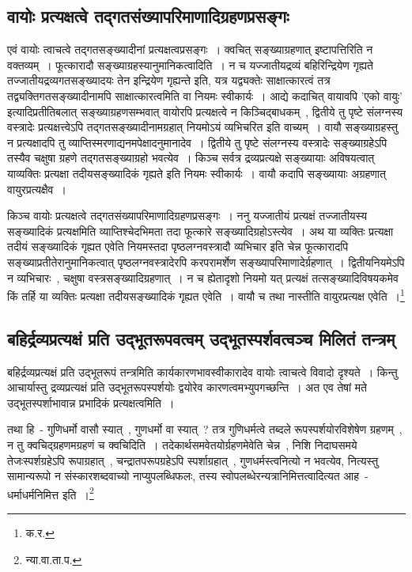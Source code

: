 		\subsection{वायोः प्रत्यक्षत्वे तद्गतसंख्यापरिमाणादिग्रहणप्रसङ्गः}

		एवं वायोः त्वाचत्वे तद्गतसङ्ख्यादीनां प्रत्यक्षत्वप्रसङ्गः~। क्वचित् सङ्ख्याग्रहणात् इष्टापत्तिरिति न वक्तव्यम्~। फूत्कारादौ सङ्ख्याग्रहस्यानुमानिकत्वादिति~। न च यज्जातीयद्रव्यं बहिरिन्द्रियेण गृह्यते तज्जातीयद्रव्यगतसङ्ख्यादयः तेन इन्द्रियेण गृह्यन्ते इति, यत्र यद्व्यक्तेः साक्षात्कारत्वं तत्र तद्व्यक्तिगतसङ्ख्यादीनामपि साक्षात्कारत्वमिति वा नियमः स्वीकार्यः~। आद्ये कदाचित् वायावपि 'एको वायुः' इत्यादिप्रतीतिबलात् सङ्ख्याग्रहणसम्भवात् वायोरपि प्रत्यक्षत्वे न किञ्चिद्बाधकम्~, द्वितीये तु पृष्टे संलग्नस्य वस्त्रादेः प्रत्यक्षत्त्वेऽपि तद्गतसङ्ख्यादीनामग्रहात् नियमोऽयं व्यभिचरित इति वाच्यम्~। वायौ सङ्ख्याग्रहस्तु न प्रत्यक्षादपि तु  व्याप्तिस्मरणाद्यनमपेक्षादनुमानादेव~। द्वितीये तु पृष्टे संलग्नस्य वस्त्रादेः‌ सङ्ख्याग्रहेऽपि तस्यैव चक्षुषा ग्रहणे तद्गतसङ्ख्याग्रहो भवत्येव~।‌ किञ्च सर्वत्र द्रव्यप्रत्यक्षे सङ्ख्यायाः अविषयत्वात् याव्यक्तिः प्रत्यक्षा तदीयसङ्ख्यादिकं गृह्यते इति नियमः स्वीकार्यः~। वायौ कदापि सङ्ख्यायाः अग्रहणात् वायुरप्रत्यक्षैव~।

		{\fontsize{11.7}{0}\selectfont\s किञ्च वायोः प्रत्यक्षत्वे तद्गतसंख्यापरिमाणादिग्रहणप्रसङ्गः~। ननु यज्जातीयं प्रत्यक्षं तज्जातीयस्य सङ्ख्यादिकं प्रत्यक्षमिति व्याप्तिश्चेदभिमता तदा फूत्कारे सङ्ख्यादिग्रहोऽस्त्येव~। अथ या व्यक्तिः प्रत्यक्षा तदीयं सङ्ख्यादिकं गृह्यत एवेति नियमस्तदा पृष्ठलग्नवस्त्रादौ व्यभिचार इति चेन्न फूत्कारादपि सङ्ख्याप्रतीतेरानुमानिकत्वात् पृष्ठलग्नवस्त्रादेरपि करपरामर्शेण सङ्ख्यापरिमाणादेर्ग्रहणात्~। द्वितीयनियमेऽपि न व्यभिचारः~, चक्षुषा वस्त्रसङ्ख्यादिग्रहणात्~। न च ह्येतादृशो नियमो  यत् प्रत्यक्षं तत्सङ्ख्यादिविषयकमेव किं तर्हि या व्यक्तिः प्रत्यक्षा तदीयसङ्ख्यादिकं गृह्यत एवेति~। वायौ च तथा नास्तीति वायुरप्रत्यक्ष एवेति~।\footnote{क.र.}}

		\subsection{बहिर्द्रव्यप्रत्यक्षं प्रति उद्भूतरूपवत्वम् उद्भूतस्पर्शवत्वञ्च मिलितं तन्त्रम्}

		बहिर्द्रव्यप्रत्यक्षं प्रति उद्भूतरूपं तन्त्रमिति कार्यकारणभावस्वीकारादेव वायोः त्वाचत्वे विवादो दृश्यते~। किन्तु आचार्यास्तु द्रव्यप्रत्यक्षं प्रति उद्भूतरूपस्पर्शयोः द्वयोरेव कारणत्वमभ्युपगच्छन्ति~। अत एव तेषां मते उद्भूतस्पर्शाभावान्न प्रभादिकं प्रत्यक्षत्वमिति~।

		{\fontsize{11.7}{0}\selectfont\s तथा हि~- गुणिधर्मो वासौ स्यात्~, गुणधर्मो वा स्यात्~? तत्र गुणिधर्मत्वे तब्दले रूपस्पर्शयोरविशेषेण ग्रहणम्~, न तु क्वचिद्ग्रहणमग्रहणं च क्वचिदिति~। तदेकार्थसमवेतयोर्ग्रहणमेवेति चेन्न~, निशि निदाघसमये तेजःस्पर्शग्रहेऽपि रूपाग्रहात्~, चन्द्रातपरूपग्रहेऽपि स्पर्शाग्रहात्~, गुणधर्मस्त्वनित्यो न भवत्येव, नित्यस्तु सामान्यरूपो न संस्कारशब्दवाच्यो नाप्युपलब्धिफलः, तस्य स्वोपलब्धेरन्यत्रानिमित्तत्वादित्यत आह~- धर्माधर्मनिमित्त इति~।\footnote{न्या.वा.ता.प.}}


